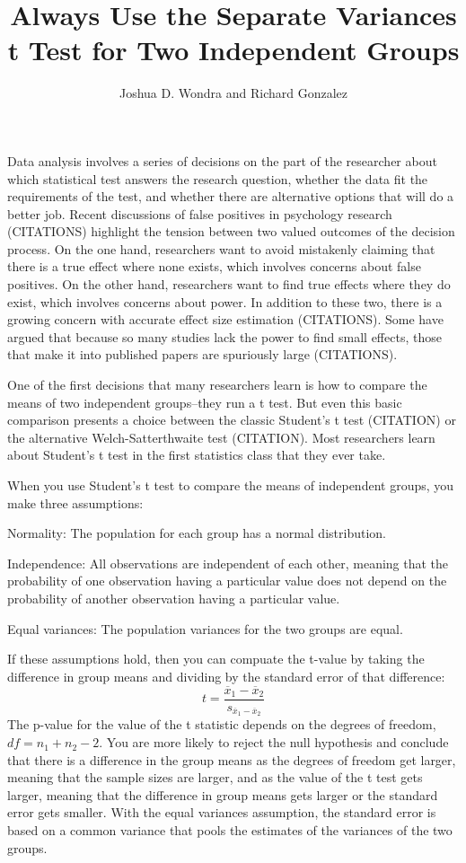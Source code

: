 \documentclass[man,a4paper,noextraspace,apacite]{apa6}\usepackage[]{graphicx}\usepackage[]{color}
\title{Always Use the Separate Variances t Test for Two Independent Groups}
\author{Joshua D. Wondra and Richard Gonzalez}
\affiliation{University of Michigan}
\begin{document}
\maketitle

    Data analysis involves a series of decisions on the part of the researcher about which statistical test answers the research question, whether the data fit the requirements of the test, and whether there are alternative options that will do a better job. Recent discussions of false positives in psychology research (CITATIONS) highlight the tension between two valued outcomes of the decision process. On the one hand, researchers want to avoid mistakenly claiming that there is a true effect where none exists, which involves concerns about false positives. On the other hand, researchers want to find true effects where they do exist, which involves concerns about power. In addition to these two, there is a growing concern with accurate effect size estimation (CITATIONS). Some have argued that because so many studies lack the power to find small effects, those that make it into published papers are spuriously large (CITATIONS).

    One of the first decisions that many researchers learn is how to compare the means of two independent groups--they run a t test. But even this basic comparison presents a choice between the classic Student's t test (CITATION) or the alternative Welch-Satterthwaite test (CITATION). Most researchers learn about Student's t test in the first statistics class that they ever take.  
    
When you use Student's t test to compare the means of independent groups, you make three assumptions: 
\begin{APAenumerate}
    \item Normality: The population for each group has a normal distribution.
    \item Independence: All observations are independent of each other, meaning that the probability of one observation having a particular value does not depend on the probability of another observation having a particular value.
    \item Equal variances: The population variances for the two groups are equal.
\end{APAenumerate}
    
If these assumptions hold, then you can compuate the t-value by taking the difference in group means and dividing by the standard error of that difference:   
    \begin{equation}
    t = \frac{\overline{x}_1-\overline{x}_2}{s_{\overline{x}_1-\overline{x}_2}}
    \end{equation}
    The p-value for the value of the t statistic depends on the degrees of freedom, $df=n_1+n_2-2$. You are more likely to reject the null hypothesis and conclude that there is a difference in the group means as the degrees of freedom get larger, meaning that the sample sizes are larger, and as the value of the t test gets larger, meaning that the difference in group means gets larger or the standard error gets smaller. With the equal variances assumption, the standard error is based on a common variance that pools the estimates of the variances of the two groups. 
\end{document}
